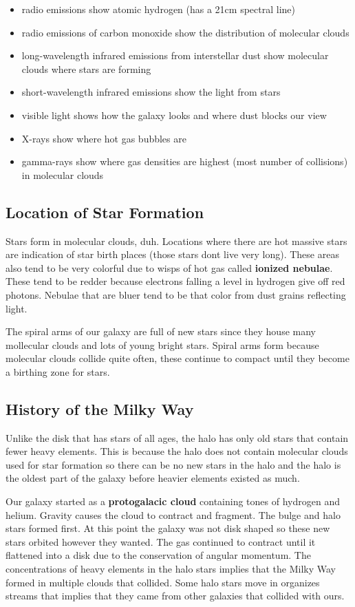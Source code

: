 \begin{itemize}
\item radio emissions show atomic hydrogen (has a 21cm spectral line)
\item radio emissions of carbon monoxide show the distribution of molecular clouds
\item long-wavelength infrared emissions from interstellar dust show molecular clouds where stars are forming
\item short-wavelength infrared emissions show the light from stars
\item visible light shows how the galaxy looks and where dust blocks our view
\item X-rays show where hot gas bubbles are
\item gamma-rays show where gas densities are highest (most number of collisions) in molecular clouds
\end{itemize}

\subsection{Location of Star Formation}
Stars form in molecular clouds, duh. Locations where there are hot massive stars are indication of star birth places (those stars dont live very long). These areas also tend to be very colorful due to wisps of hot gas called \textbf{ionized nebulae}. These tend to be redder because electrons falling a level in hydrogen give off red photons. Nebulae that are bluer tend to be that color from dust grains reflecting light.

The spiral arms of our galaxy are full of new stars since they house many mollecular clouds and lots of young bright stars. Spiral arms form because molecular clouds collide quite often, these continue to compact until they become a birthing zone for stars.

\subsection{History of the Milky Way}
Unlike the disk that has stars of all ages, the halo has only old stars that contain fewer heavy elements. This is because the halo does not contain molecular clouds used for star formation so there can be no new stars in the halo and the halo is the oldest part of the galaxy before heavier elements existed as much.

Our galaxy started as a \textbf{protogalacic cloud} containing tones of hydrogen and helium. Gravity causes the cloud to contract and fragment. The bulge and halo stars formed first. At this point the galaxy was not disk shaped so these new stars orbited however they wanted. The gas continued to contract until it flattened into a disk due to the conservation of angular momentum. The concentrations of heavy elements in the halo stars implies that the Milky Way formed in multiple clouds that collided. Some halo stars move in organizes streams that implies that they came from other galaxies that collided with ours.

